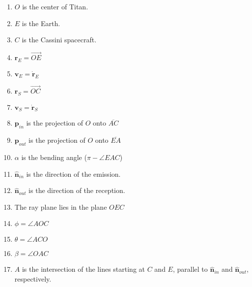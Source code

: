         \begin{enumerate}
            \item $O$ is the center of Titan.
            \item $E$ is the Earth.
            \item $C$ is the Cassini spacecraft.
            \item $\mathbf{r}_{E}=\overrightarrow{OE}$
            \item $\mathbf{v}_{E}=\dot{\mathbf{r}}_{E}$
            \item $\mathbf{r}_{S}=\overrightarrow{OC}$
            \item $\mathbf{v}_{S}=\dot{\mathbf{r}}_{S}$
            \item $\mathbf{p}_{in}$ is the projection of
                  $O$ onto $\overline{AC}$
            \item $\mathbf{p}_{out}$ is the projection
                  of $O$ onto $\overline{EA}$
            \item $\alpha$ is the bending angle
                  ($\pi-\angle EAC$)
            \item $\hat{\mathbf{n}}_{in}$ is the
                  direction of the emission.
            \item $\hat{\mathbf{n}}_{out}$ is the
                  direction of the reception.
            \item The ray plane lies in the plane $OEC$
            \item $\phi=\angle{AOC}$
            \item $\theta=\angle{ACO}$
            \item $\beta=\angle{OAC}$
            \item $A$ is the intersection of the lines
                  starting at $C$ and $E$, parallel to
                  $\hat{\mathbf{n}}_{in}$ and
                  $\hat{\mathbf{n}}_{out}$, respectively.
        \end{enumerate}

